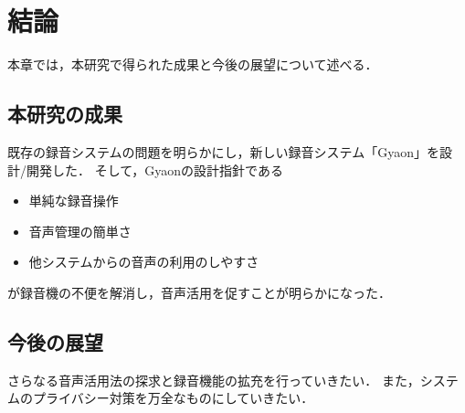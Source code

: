 \chapter{結論}
\label{chap:conclusion}

本章では，本研究で得られた成果と今後の展望について述べる．

\newpage

\section{本研究の成果}

既存の録音システムの問題を明らかにし，新しい録音システム「Gyaon」を設計/開発した．
そして，Gyaonの設計指針である

\begin{itemize}
\item 単純な録音操作
\item 音声管理の簡単さ
\item 他システムからの音声の利用のしやすさ
\end{itemize}

が録音機の不便を解消し，音声活用を促すことが明らかになった．

\section{今後の展望}

さらなる音声活用法の探求と録音機能の拡充を行っていきたい．
また，システムのプライバシー対策を万全なものにしていきたい．
